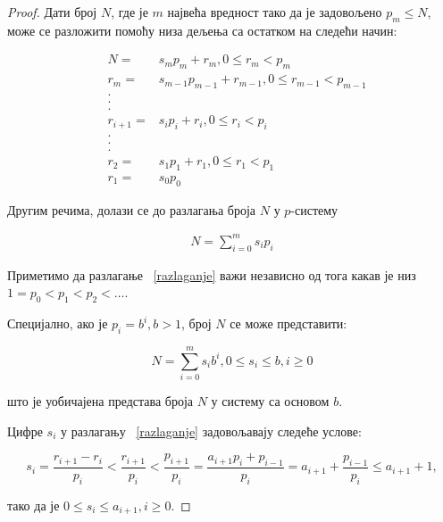 \documentclass[a4paper]{article}
\begin{document}
\begin{proof}
	Дати број $ N $, где је $ m $ највећа вредност тако да је задовољено $ p_{m} \leq N $, може се разложити помоћу низа дељења са остатком на следећи начин:
	
	\begin{eqnarray*}
		&N = &s_{m}p_{m} + r_{m}, 0 \leq r_{m} < p_{m}\\
		&r_{m} = &s_{m-1}p_{m-1} + r_{m-1}, 0 \leq r_{m-1} < p_{m-1}\\
		& . \\
		& . \\
		& . \\
		&r_{i+1} = &s_{i}p_{i} + r_{i}, 0 \leq r_{i} < p_{i}\\
		& . \\
		& . \\
		& . \\
		&r_{2} =& s_{1}p_{1} + r_{1}, 0 \leq r_{1} < p_{1}\\
		&r_{1} =& s_{0}p_{0} 
	\end{eqnarray*}
	
	Другим речима, долази се до разлагања броја $ N $ у $ p $-систему 
	
		 \begin{eqnarray}
			 \label{razlaganje} N = \sum_{i=0}^{m} s_{i}p_{i} 
		 \end{eqnarray}
	
	Приметимо да разлагање ~\eqref{razlaganje} важи независно од тога какав је низ $ 1 = p_{0} < p_{1} < p_{2} < \ldots $. 
	
	Специјално, ако је $ p_{i} = b^{i}, b > 1 $, број $ N $ се може представити:
	
	\begin{displaymath}
		N = \sum_{i=0}^{m} s_{i}b^{i}, 0 \leq s_{i} \le b, i \geq 0
	\end{displaymath}
	
	што је уобичајена представа броја $ N $ у систему са основом $ b $.
	
	Цифре $ s_{i} $ у разлагању ~\eqref{razlaganje} задовољавају следеће услове:
	
	\begin{displaymath}
		s_{i} = \frac{r_{i+1} - r_{i}}{p_{i}} < \frac{r_{i+1}}{p_{i}} < \frac{p_{i+1}}{p_{i}} = \frac{a_{i+1}p_{i}+p_{i-1}}{p_{i}} = a_{i+1} + \frac{p_{i-1}}{p_{i}} \leq a_{i+1} + 1, 
	\end{displaymath} 
	 
	тако да је $ 0 \leq s_{i} \leq a_{i+1}, i \geq 0 $.
	

\end{proof}
\end{document}
